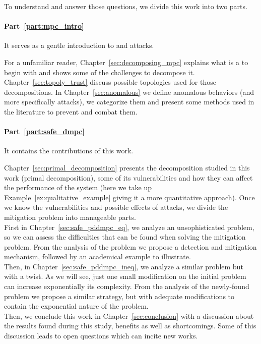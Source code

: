 \documentclass[../main.tex]{subfiles}
\begin{document}
To understand and answer those questions, we divide this work into two parts.

\paragraph{Part~\ref{part:mpc_intro}} It serves as a gentle introduction to \dmpc{} and attacks.

For a unfamiliar reader, Chapter~\ref{sec:decomposing_mpc} explains what is a \mpc{} to begin with and shows some of the challenges to decompose it.
Chapter~\ref{sec:topoly_trust} discuss possible topologies used for those decompositions.
In Chapter~\ref{sec:anomalous} we define anomalous behaviors (and more specifically attacks), we categorize them and present some methods used in the literature to prevent and combat them.

\paragraph{Part~\ref{part:safe_dmpc}} It contains the contributions of this work.

Chapter~\ref{sec:primal_decomposition} presents the decomposition studied in this work (primal decomposition), some of its vulnerabilities and how they can affect the performance of the system (here we take up Example~\ref{ex:qualitative_example} giving it a more quantitative approach).
Once we know the vulnerabilities and possible effects of attacks, we divide the mitigation problem into manageable parts.
\\ First in Chapter~\ref{sec:safe_pddmpc_eq}, we analyze an unsophisticated problem, so we can assess the difficulties that can be found when solving the mitigation problem. From the analysis of the problem we propose a detection and mitigation mechanism, followed by an academical example to illustrate.
\\Then, in Chapter~\ref{sec:safe_pddmpc_ineq}, we analyze a similar problem but with a twist. As we will see, just one small modification on the initial problem can increase exponentially its complexity.
From the analysis of the newly-found problem we propose a similar strategy, but with adequate modifications to contain the exponential nature of the problem.
\\Then, we conclude this work in Chapter~\ref{sec:conclusion} with a discussion about the results found during this study, benefits as well as shortcomings. Some of this discussion leads to open questions which can incite new works.
\end{document}
